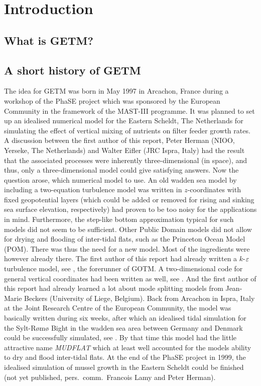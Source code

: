 \section{Introduction}

\subsection{What is GETM?}


\subsection{A short history of GETM}\label{SectionHistory}

The idea for GETM was born in May 1997 in Arcachon, France during a 
workshop of the PhaSE project which was sponsored by the European Community
in the framework of the MAST-III programme. It was planned  
to set up an idealised numerical model for the Eastern Scheldt, The Netherlands
for simulating the effect of vertical mixing of nutrients on filter feeder
growth rates. A discussion between the first author of this report,
Peter Herman (NIOO, Yerseke, The Netherlands) and Walter Eifler
(JRC Ispra, Italy) had the result that the
associated processes were inherently three-dimensional (in space), and thus,
only a three-dimensional model could give satisfying answers. 
Now the question arose, which numerical model to use. An old
wadden sea model by \cite{BURCHARD95} including a two-equation turbulence
model was written in $z$-coordinates with fixed geopotential layers
(which could be added or removed for rising and sinking sea surface elevation,
respectively) had proven to be too noisy for the applications in mind.
Furthermore, the step-like bottom approximation typical for such models
did not seem to be sufficient. Other Public Domain models did not allow for
drying and flooding of inter-tidal flats, such as the Princeton Ocean Model
(POM). There was thus the need for a new model. Most of the ingredients were
however already there. The first author of this report had already written a
$k$-$\varepsilon$ turbulence model, see \cite{BURCHARDea95}, the forerunner
of GOTM. A two-dimensional code for general vertical coordinates had been
written as well, see \cite{BURCHARDea97}. And the first author of this report
had already learned a lot about mode splitting models from
Jean-Marie Beckers (University of Liege, Belgium).   
Back from Arcachon in Ispra, Italy at the Joint Research Centre
of the European Community, the model was basically written during six weeks,
after which an idealised tidal simulation for the Sylt-R\o m\o{} Bight
in the wadden sea area between Germany and Denmark could be successfully
simulated, see \cite{BURCHARD98}.
By that time this model had the little attractive name {\it MUDFLAT}
which at least well accounted for
the models ability to dry and flood inter-tidal flats.  
At the end of the PhaSE project in 1999, the 
idealised simulation of mussel growth in the Eastern Scheldt could be
finished (not yet published, pers.\ comm.\ Francois Lamy and Peter Herman).  

